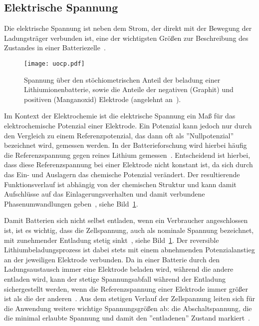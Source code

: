 

\subsection{Elektrische Spannung}

Die elektrische Spannung ist neben dem Strom, der direkt mit der Bewegung der Ladungsträger verbunden ist, eine der wichtigsten Größen zur Beschreibung des Zustandes in einer Batteriezelle~\cite{Beard2019}. 

\begin{figure}[h]
    \center
		\texttt{[image: uocp.pdf]}
		\caption{\label{fig:battery_voltage}Spannung über den stöchiometrischen Anteil der beladung einer Lithiumionenbatterie, sowie die Anteile der negativen (Graphit) und positiven (Manganoxid) Elektrode (angelehnt an~\cite{Newman2021}).}
\end{figure}

Im Kontext der Elektrochemie ist die elektrische Spannung ein Maß für das elektrochemische Potenzial einer Elektrode. Ein Potenzial kann jedoch nur durch den Vergleich zu einem Referenzpotenzial, das dann oft als ''Nullpotenzial'' bezeichnet wird, gemessen werden. In der Batterieforschung wird hierbei häufig die Referenzspannung gegen reines Lithium gemessen~\cite{Newman2021}. Entscheidend ist hierbei, dass diese Referenzspannung bei einer Elektrode nicht konstant ist, da sich durch das Ein- und Auslagern das chemische Potenzial verändert. Der resultierende Funktionsverlauf ist abhängig von der chemischen Struktur und kann damit Aufschlüsse auf das Einlagerungsverhalten und damit verbundene Phasenumwandlungen geben~\cite{Plett2015}, siehe Bild~\ref{fig:battery_voltage}.

Damit Batterien sich nicht selbst entladen, wenn ein Verbraucher angeschlossen ist, ist es wichtig, dass die Zellspannung, auch als nominale Spannung bezeichnet, mit zunehmender Entladung stetig sinkt~\cite{Newman2021}, siehe Bild~\ref{fig:battery_voltage}. Der reversible Lithiumbeladungsprozess ist dabei stets mit einem abnehmenden Potenzialanstieg an der jeweiligen Elektrode verbunden. Da in einer Batterie durch den Ladungsaustausch immer eine Elektrode beladen wird, während die andere entladen wird, kann der stetige Spannungsabfall während der Entladung sichergestellt werden, wenn die Referenzspannung einer Elektrode immer größer ist als die der anderen~\cite{Plett2024}. Aus dem stetigen Verlauf der Zellspannung leiten sich für die Anwendung weitere wichtige Spannungsgrößen ab: die Abschaltspannung, die die minimal erlaubte Spannung und damit den ''entladenen'' Zustand markiert~\cite{Plett2015}.

